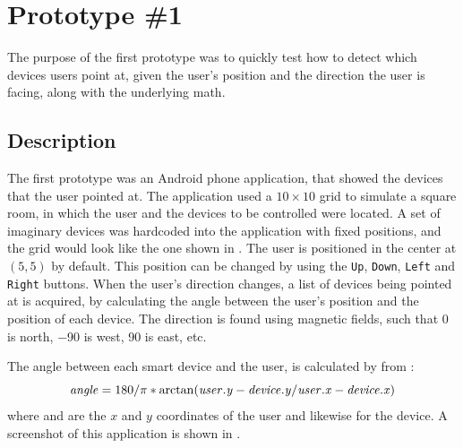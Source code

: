 \section{Prototype \#1}
\label{sec:implementation:prototypes:prototype1}
The purpose of the first prototype 
was to quickly test how to detect which devices users point at, 
given the user's position and the direction the user is facing, 
along with the underlying math.

\subsection{Description}
The first prototype was an Android phone application, 
that showed the devices that the user pointed at.
The application used a $10 \times 10$ grid to simulate a square room, 
in which the user and the devices to be controlled were located.
A set of imaginary devices was hardcoded into the application with fixed positions, 
and the grid would look like the one shown in .
The user is positioned in the center at $(5,5)$ by default. 
This position can be changed by using the \texttt{Up}, \texttt{Down}, \texttt{Left} and \texttt{Right} buttons.
When the user's direction changes, 
a list of devices being pointed at is acquired, 
by calculating the angle between the user's position and the position of each device.
The direction is found using magnetic fields, 
such that \num{0} is north, \num{-90} is west, \num{90} is east, etc. 

The angle between each smart device and the user, 
is calculated by  from :
\begin{equation}
\var{angle} = 180 / \pi * \arctan(\var{user.y} - \var{device.y} / \var{user.x} - \var{device.x})
\end{equation}
where  and  are the $x$ and $y$ coordinates of the user and likewise for the device.
A screenshot of this application is shown in .

